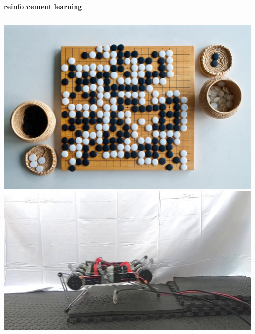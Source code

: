 \documentclass[xcolor=dvipsnames]{beamer}
\begin{document}
\begin{frame}{\bf reinforcement learning}
\begin{columns}
    \begin{column}{0.5\textwidth}
      {\centering \includegraphics[scale=0.03]{../images/go.jpg}}
      {\centering \includegraphics[scale=0.1]{../images/sac_minitaur.jpg}}
    \end{column}


  \end{columns}

\end{frame}
\end{document}
